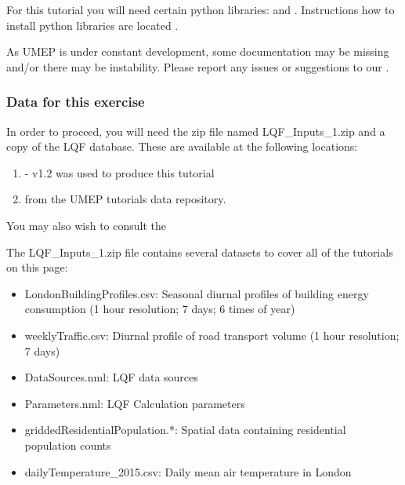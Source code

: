 \documentclass[letterpaper,10pt,english]{sphinxmanual}
\begin{document}
For this tutorial you will need certain python libraries:  and
. Instructions how to install python libraries are located
{\hyperref[\detokenize{Getting_Started:python-libraries}]{}}.

As UMEP is under constant development, some documentation may be missing
and/or there may be instability. Please report any issues or suggestions
to our .


\subsubsection{Data for this exercise}
\label{\detokenize{Tutorials/LQF:data-for-this-exercise}}
In order to proceed, you will need the zip file named LQF\_Inputs\_1.zip
and a copy of the LQF database. These are available at the following
locations:
\begin{enumerate}
\item {} 
 - v1.2 was used to
produce this tutorial

\item {} 
from the UMEP tutorials data repository.

\end{enumerate}

You may also wish to consult the 

The LQF\_Inputs\_1.zip file contains several datasets to cover all of
the tutorials on this page:
\begin{itemize}
\item {} 
LondonBuildingProfiles.csv: Seasonal diurnal profiles of building
energy consumption (1 hour resolution; 7 days; 6 times of year)

\item {} 
weeklyTraffic.csv: Diurnal profile of road transport volume (1 hour
resolution; 7 days)

\item {} 
DataSources.nml: LQF data sources

\item {} 
Parameters.nml: LQF Calculation parameters

\item {} 
griddedResidentialPopulation.*: Spatial data containing residential
population counts

\item {} 
dailyTemperature\_2015.csv: Daily mean air temperature in London

\end{itemize}
\end{document}
